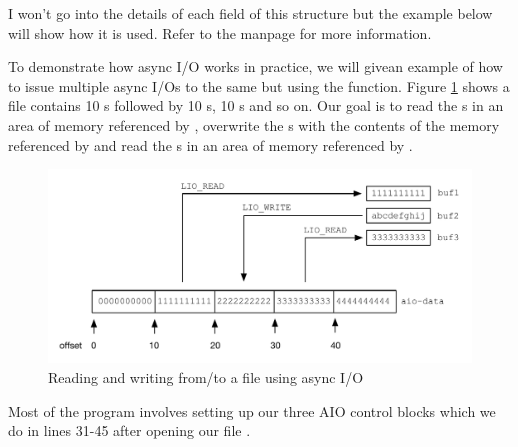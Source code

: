 \noindent
I won't go into the details of each field of this structure but the example below will show how it is used. Refer to the  manpage for more information.

To demonstrate how async I/O works in practice, we will givean example of how to issue multiple async I/Os to the same but using the  function. Figure \ref{fig:asyncio} shows a file contains 10 s followed by 10 s, 10 s and so on. Our goal is to read the s in an area of memory referenced by , overwrite the s with the contents of the memory referenced by  and read the s in an area of memory referenced by .

\begin{figure}
	\includegraphics[scale=0.6]{figures/asyncio.pdf}
	\centering
	\caption{Reading and writing from/to a file using async I/O}
	\label{fig:asyncio}
\end{figure}

Most of the program involves setting up our three AIO control blocks which we do in lines 31-45 after opening our file .

